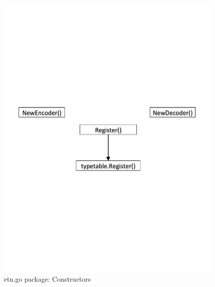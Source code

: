 \begin{figure}[H]
\centering
\includegraphics[scale=0.50]{callGraphs/etnConstructorsPackage}
\caption{etn.go package: Constructors}
\end{figure}